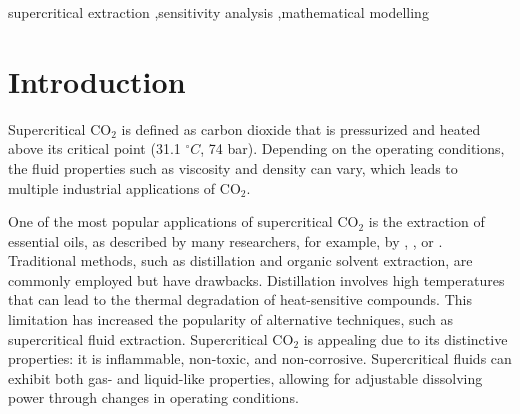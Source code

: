 \documentclass[a4paper,fleqn]{cas-dc}
\begin{document}
	\begin{keywords}
		supercritical extraction \sep sensitivity analysis \sep mathematical modelling
	\end{keywords}
	
	\maketitle
	
	
	\section{Introduction}
	
	Supercritical CO$_2$ is defined as carbon dioxide that is pressurized and heated above its critical point (31.1 $^\circ C$, 74 bar). Depending on the operating conditions, the fluid properties such as viscosity and density can vary, which leads to multiple industrial applications of CO$_2$.
	
	One of the most popular applications of supercritical CO$_2$ is the extraction of essential oils, as described by many researchers, for example, by \citet{Sodeifian2017}, \citet{Reverchon1993}, or \citet{Sovova1994}. Traditional methods, such as distillation and organic solvent extraction, are commonly employed but have drawbacks. Distillation involves high temperatures that can lead to the thermal degradation of heat-sensitive compounds. This limitation has increased the popularity of alternative techniques, such as supercritical fluid extraction. Supercritical CO$_2$ is appealing due to its distinctive properties: it is inflammable, non-toxic, and non-corrosive. Supercritical fluids can exhibit both gas- and liquid-like properties, allowing for adjustable dissolving power through changes in operating conditions.
	
\end{document}
